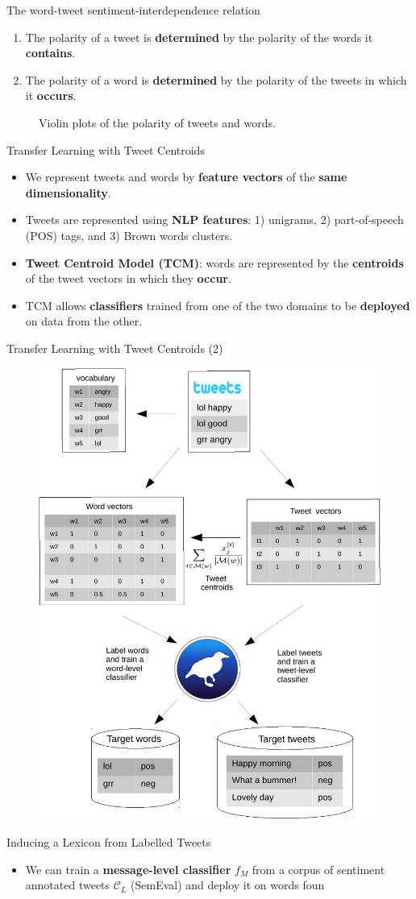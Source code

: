 \documentclass[handout]{beamer}
\begin{document}
\begin{frame}{The word-tweet sentiment-interdependence relation}
\begin{scriptsize}
\begin{enumerate}
\item The polarity of a tweet is \textbf{determined} by the polarity of the words it \textbf{contains}.
\item The polarity of a word is \textbf{determined} by the polarity of the tweets in which it \textbf{occurs}. 
\end{enumerate}
\end{scriptsize}

\begin{figure}[htb]
\begin{center}
\caption{Violin plots of the polarity of tweets and words.}
\label{fig:vio}
\end{center}
\end{figure}

\end{frame} 


\begin{frame}{Transfer Learning with Tweet Centroids}
\begin{scriptsize}
\begin{itemize}
\item We represent tweets and words by \textbf{feature vectors} of the \textbf{same dimensionality}. 
\item Tweets are represented using \textbf{NLP features}: 1) unigrams, 2) part-of-speech (POS) tags, and 3) Brown words clusters.
\item \textbf{Tweet Centroid Model (TCM)}: words are represented by the \textbf{centroids} of the tweet vectors in which they \textbf{occur}.
\item TCM allows \textbf{classifiers} trained from one of the two domains to be \textbf{deployed} on data from the other.
\end{itemize}
\end{scriptsize}
\end{frame}





\begin{frame}{Transfer Learning with Tweet Centroids (2)}

\begin{figure}[htb]
	\centering
	 \includegraphics[scale=0.4]{pics/tweetsToWords.pdf}
\end{figure}



\end{frame}



\begin{frame}{Inducing a Lexicon from Labelled Tweets}
\begin{scriptsize}
\begin{itemize}
 \item We can train a \textbf{message-level classifier} $f_M$ from a corpus of sentiment annotated tweets $\mathcal{C}_L$ (SemEval) and deploy it on words foun
\end{itemize}
\end{scriptsize}
\end{frame}
\end{document}
